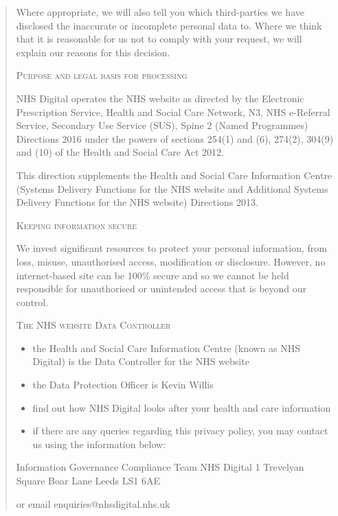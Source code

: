\documentclass[twocolumn, letterpaper,13pt]{scrartcl}
\begin{document}
\begin{quote}
        Where appropriate, we will also tell you which third-parties we have disclosed the inaccurate or incomplete personal data to. Where we think that it is reasonable for us not to comply with your request, we will explain our reasons for this decision.
        
        \textsc{Purpose and legal basis for processing}
        
        NHS Digital operates the NHS website as directed by the Electronic Prescription Service, Health and Social Care Network, N3, NHS e-Referral Service, Secondary Use Service (SUS), Spine 2 (Named Programmes) Directions 2016 under the powers of sections 254(1) and (6), 274(2), 304(9) and (10) of the Health and Social Care Act 2012.
        
        This direction supplements the Health and Social Care Information Centre (Systems Delivery Functions for the NHS website and Additional Systems Delivery Functions for the NHS website) Directions 2013.
        
        \textsc{Keeping information secure}
        
        We invest significant resources to protect your personal information, from loss, misuse, unauthorised access, modification or disclosure. However, no internet-based site can be 100\% secure and so we cannot be held responsible for unauthorised or unintended access that is beyond our control.
        
        \textsc{The NHS website Data Controller}
        
        \begin{itemize}
            \item the Health and Social Care Information Centre (known as NHS Digital) is the Data Controller for the NHS website
            \item the Data Protection Officer is Kevin Willis
            \item find out how NHS Digital looks after your health and care information
            \item if there are any queries regarding this privacy policy, you may contact us using the information below:
        \end{itemize}
        
        Information Governance Compliance Team
        NHS Digital
        1 Trevelyan Square
        Boar Lane
        Leeds LS1 6AE
        
        or email enquiries@nhsdigital.nhs.uk
        

\end{quote}
\end{document}
